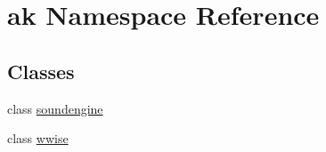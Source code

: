 \hypertarget{namespaceak}{}\section{ak Namespace Reference}
\label{namespaceak}
\subsection*{Classes}
\begin{DoxyCompactItemize}
\item 
class \mbox{\hyperlink{classak_1_1soundengine}{soundengine}}
\item 
class \mbox{\hyperlink{classak_1_1wwise}{wwise}}
\end{DoxyCompactItemize}
